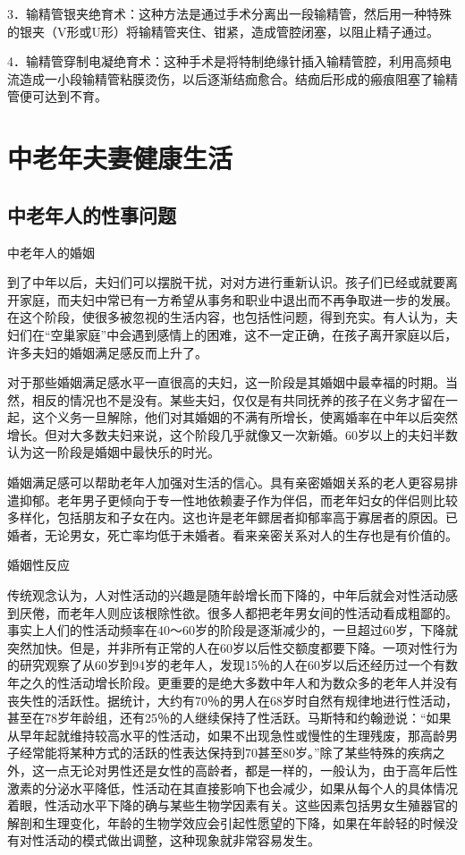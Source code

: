 \documentclass[12pt,UTF8,openany]{ctexbook}
\begin{document}
3．输精管银夹绝育术：这种方法是通过手术分离出一段输精管，然后用一种特殊的银夹（V形或U形）将输精管夹住、钳紧，造成管腔闭塞，以阻止精子通过。

4．输精管穿制电凝绝育术：这种手术是将特制绝缘针插入输精管腔，利用高频电流造成一小段输精管粘膜烫伤，以后逐渐结痂愈合。结痂后形成的瘢痕阻塞了输精管便可达到不育。





\part{中老年夫妻健康生活}





\chapter{中老年人的性事问题}


中老年人的婚姻


到了中年以后，夫妇们可以摆脱干扰，对对方进行重新认识。孩子们已经或就要离开家庭，而夫妇中常已有一方希望从事务和职业中退出而不再争取进一步的发展。在这个阶段，使很多被忽视的生活内容，也包括性问题，得到充实。有人认为，夫妇们在“空巢家庭”中会遇到感情上的困难，这不一定正确，在孩子离开家庭以后，许多夫妇的婚姻满足感反而上升了。

对于那些婚姻满足感水平一直很高的夫妇，这一阶段是其婚姻中最幸福的时期。当然，相反的情况也不是没有。某些夫妇，仅仅是有共同抚养的孩子在义务才留在一起，这个义务一旦解除，他们对其婚姻的不满有所增长，使离婚率在中年以后突然增长。但对大多数夫妇来说，这个阶段几乎就像又一次新婚。60岁以上的夫妇半数认为这一阶段是婚姻中最快乐的时光。

婚姻满足感可以帮助老年人加强对生活的信心。具有亲密婚姻关系的老人更容易排遣抑郁。老年男子更倾向于专一性地依赖妻子作为伴侣，而老年妇女的伴侣则比较多样化，包括朋友和子女在内。这也许是老年鳏居者抑郁率高于寡居者的原因。已婚者，无论男女，死亡率均低于未婚者。看来亲密关系对人的生存也是有价值的。





婚姻性反应


传统观念认为，人对性活动的兴趣是随年龄增长而下降的，中年后就会对性活动感到厌倦，而老年人则应该根除性欲。很多人都把老年男女间的性活动看成粗鄙的。事实上人们的性活动频率在40～60岁的阶段是逐渐减少的，一旦超过60岁，下降就突然加快。但是，并非所有正常的人在60岁以后性交额度都要下降。一项对性行为的研究观察了从60岁到94岁的老年人，发现15％的人在60岁以后还经历过一个有数年之久的性活动增长阶段。更重要的是绝大多数中年人和为数众多的老年人并没有丧失性的活跃性。据统计，大约有70％的男人在68岁时自然有规律地进行性活动，甚至在78岁年龄组，还有25％的人继续保持了性活跃。马斯特和约翰逊说：“如果从早年起就维持较高水平的性活动，如果不出现急性或慢性的生理残废，那高龄男子经常能将某种方式的活跃的性表达保持到70甚至80岁。”除了某些特殊的疾病之外，这一点无论对男性还是女性的高龄者，都是一样的，一般认为，由于高年后性激素的分泌水平降低，性活动在其直接影响下也会减少，如果从每个人的具体情况着眼，性活动水平下降的确与某些生物学因素有关。这些因素包括男女生殖器官的解剖和生理变化，年龄的生物学效应会引起性愿望的下降，如果在年龄轻的时候没有对性活动的模式做出调整，这种现象就非常容易发生。
\end{document}
